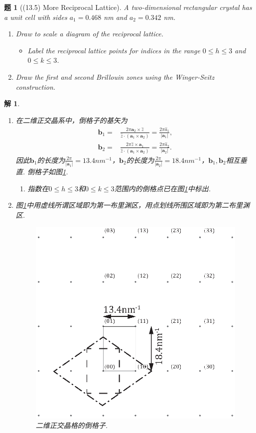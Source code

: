 \documentclass[UTF8,10pt,a4paper]{article}
\theoremstyle{Problem}
\newtheorem{prob}{题}
\theoremstyle{Solution}
\newtheorem*{sol}{解}
\providecommand{\abs}[1]{\left\lvert#1\right\rvert}
\begin{document}
\begin{prob}[(13.5) More Reciprocal Lattice]
    A two-dimensional rectangular crystal has a unit cell with sides $a_1=0.468$ nm and $a_2=0.342$ nm.
    \begin{enumerate}
        \item[(a)] Draw to scale a diagram of the reciprocal lattice.
        \begin{itemize}
            \item[$\triangleright$] Label the reciprocal lattice points for indices in the range $0\leq h\leq 3$ and $0\leq k\leq 3$.
        \end{itemize}
        \item[(b)] Draw the first and second Brillouin zones using the Winger-Seitz construction.
    \end{enumerate}
\end{prob}
\begin{sol}
    \begin{enumerate}
        \item[(a)] 在二维正交晶系中，倒格子的基矢为
        \begin{align*}
            \bm{b}_1=&\frac{2\pi\bm{a}_2\times\hat{z}}{\hat{z}\cdot(\bm{a}_1\times\bm{a}_2)}=\frac{2\pi\hat{a}_1}{\abs{\bm{a}_1}},\\
            \bm{b}_2=&\frac{2\pi\hat{z}\times\bm{a}_1}{\hat{z}\cdot(\bm{a}_1\times\bm{a}_2)}=\frac{2\pi\hat{a}_2}{\abs{\bm{a}_2}}.
        \end{align*}
        因此$\bm{b}_1$的长度为$\frac{2\pi}{\abs{\bm{a}_1}}=13.4nm^{-1}$，$\bm{b}_2$的长度为$\frac{2\pi}{\abs{\bm{a}_2}}=18.4nm^{-1}$，$\bm{b}_1,\bm{b}_2$相互垂直. 倒格子如图\ref{4-RL}.
        \begin{enumerate}
            \item[$\triangleright$] 指数在$0\leq h\leq 3$和$0\leq k\leq 3$范围内的倒格点已在图\ref{4-RL}中标出.
        \end{enumerate}
        \item[(b)] 图\ref{4-RL}中用虚线所谓区域即为第一布里渊区，用点划线所围区域即为第二布里渊区.
        \begin{figure}[h]
            \centering
            \includegraphics[width=.4\textwidth]{4.eps}
            \caption{二维正交晶格的倒格子.}
            \label{4-RL}
        \end{figure}
    \end{enumerate}
\end{sol}
\end{document}
